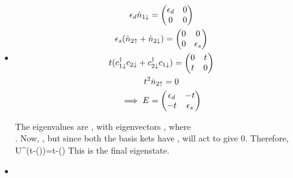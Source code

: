 \documentclass[12pt]{article}
\begin{document}
\subsection{}
\begin{itemize}
    \item {}

\begin{gather}
	\epsilon_d\hat n_{1\downarrow}=\begin{pmatrix}\epsilon_d & 0 \\ 0 & 0 \end{pmatrix}\\
	\epsilon_s(\hat n_{2\uparrow}+\hat n_{2\downarrow})=\begin{pmatrix}0 & 0 \\ 0 & \epsilon_s \end{pmatrix}\\
	t(c_{1\downarrow}^\dagger c_{2\downarrow}+c_{2\downarrow}^\dagger c_{1\downarrow})=\begin{pmatrix}0 & t \\ t & 0 \end{pmatrix}\\
	t^2\hat n_{2\uparrow}=0\\
	\implies E= \begin{pmatrix}\epsilon_d & -t \\ -t & \epsilon_s \end{pmatrix}
\end{gather}

The eigenvalues are , with eigenvectors , where \\. Now, , but since both the basis kets have , \il{\eta^\dagger} will act to give 0. Therefore,
\beq
	U^\dagger(t-(\pm{}))=t-(\pm{})
\eeq
This is the final eigenstate.

\item {}


\end{itemize}
\end{document}
